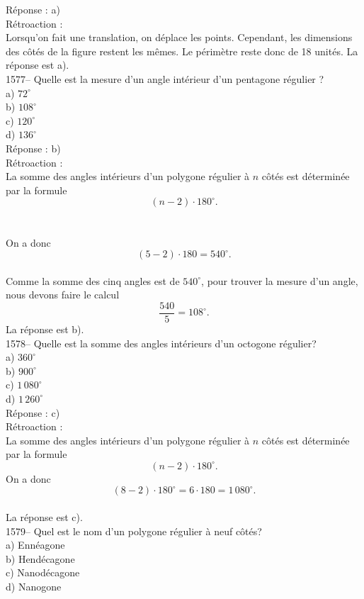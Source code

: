 R\'eponse : a)\\

R\'etroaction :\\
Lorsqu'on fait une translation, on d\'eplace les points. Cependant,
les dimensions des c\^ot\'es de la figure restent les m\^emes. Le
p\'erim\`etre reste donc de 18 unit\'es. La r\'eponse est a).\\

1577-- Quelle est la mesure d'un angle int\'erieur d'un pentagone r\'egulier
?\\
a) $72^{\circ}$\\
b) $108^{\circ}$\\
c) $120^{\circ}$\\
d) $136^{\circ}$\\

R\'eponse : b)\\

R\'etroaction :\\
La somme des angles int\'erieurs d'un polygone r\'egulier \`a $n$
c\^ot\'es est d\'etermin\'ee par la formule
$$(n-2)\cdot180^{\circ}.$$\\\\
On a donc $$(5-2)\cdot180=540^{\circ}.$$\\

Comme la somme des cinq angles est de $540^{\circ}$, pour trouver la
mesure d'un angle, nous devons faire le calcul
$$\frac{540}{5}=108^{\circ}.$$ La r\'eponse est b).\\

1578-- Quelle est la somme des angles int\'erieurs d'un octogone
r\'egulier?\\
a) $360^{\circ}$\\
b) $900^{\circ}$\\
c) $1\,080^{\circ}$\\
d) $1\,260^{\circ}$\\

R\'eponse : c)\\

R\'etroaction :\\
La somme des angles int\'erieurs d'un polygone r\'egulier \`a $n$
c\^ot\'es est d\'etermin\'ee par la formule
$$(n-2)\cdot180^{\circ}.$$
On a donc $$(8-2)\cdot180^{\circ}=6\cdot180=1\,080^{\circ}.$$\\
La r\'eponse est c).\\

1579-- Quel est le nom d'un polygone r\'egulier \`a neuf c\^ot\'es?\\
a) Enn\'eagone\\
b) Hend\'ecagone\\
c) Nanod\'ecagone\\
d) Nanogone\\

